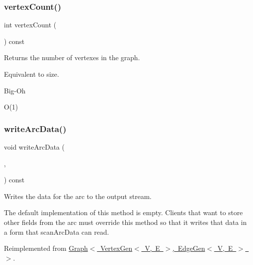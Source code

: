 \subsubsection{\texorpdfstring{vertex\+Count()}{vertexCount()}}
{\footnotesize\ttfamily int vertex\+Count (\begin{DoxyParamCaption}{ }\end{DoxyParamCaption}) const}



Returns the number of vertexes in the graph. 

Equivalent to size. \begin{DoxyRefDesc}{Big-\/\+Oh}
\item[\mbox{\hyperlink{BigOh__BigOh000037}{Big-\/\+Oh}}]O(1) \end{DoxyRefDesc}
\mbox{\label{classBasicGraphGen_ae7be688f4ddbd7da8eb2a8c7eef8901c}} 
\subsubsection{\texorpdfstring{write\+Arc\+Data()}{writeArcData()}}
{\footnotesize\ttfamily void write\+Arc\+Data (\begin{DoxyParamCaption}\item[{std\+::ostream \&}]{,  }\item[{Edge\+Gen$<$ V, E $>$ $\ast$}]{ }\end{DoxyParamCaption}) const\hspace{0.3cm}{\ttfamily [virtual]}}



Writes the data for the arc to the output stream. 

The default implementation of this method is empty. Clients that want to store other fields from the arc must override this method so that it writes that data in a form that scan\+Arc\+Data can read. 

Reimplemented from \mbox{\hyperlink{classGraph_ac9ab61a83ff4792f63e9e110b534cdfd}{Graph$<$ Vertex\+Gen$<$ V, E $>$, Edge\+Gen$<$ V, E $>$ $>$}}.

\mbox{\label{classGraph_ac0db5231476c8cb10655d58ebc108b78}} 

